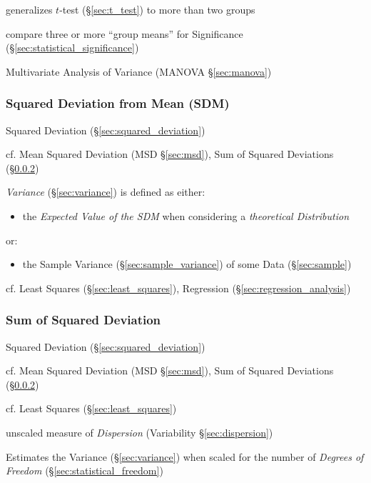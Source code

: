 generalizes $t$-test (\S\ref{sec:t_test}) to more than two groups

compare three or more ``group means'' for Significance
(\S\ref{sec:statistical_significance})

\fist Multivariate Analysis of Variance (MANOVA \S\ref{sec:manova})



\subsubsection{Squared Deviation from Mean (SDM)}\label{sec:sdm}

\fist Squared Deviation (\S\ref{sec:squared_deviation})

cf. Mean Squared Deviation (MSD \S\ref{sec:msd}), Sum of Squared
Deviations (\S\ref{sec:sum_squared_deviation})

\emph{Variance} (\S\ref{sec:variance}) is defined as either:
\begin{itemize}
  \item the \emph{Expected Value of the SDM} when considering a
    \emph{theoretical Distribution}
\end{itemize}
or:
\begin{itemize}
  \item the Sample Variance (\S\ref{sec:sample_variance}) of some Data
    (\S\ref{sec:sample})
\end{itemize}

cf. Least Squares (\S\ref{sec:least_squares}), Regression
(\S\ref{sec:regression_analysis})



\subsubsection{Sum of Squared Deviation}\label{sec:sum_squared_deviation}

\fist Squared Deviation (\S\ref{sec:squared_deviation})

cf. Mean Squared Deviation (MSD \S\ref{sec:msd}), Sum of Squared
Deviations (\S\ref{sec:sum_squared_deviation})

\fist cf. Least Squares (\S\ref{sec:least_squares})

unscaled measure of \emph{Dispersion} (Variability \S\ref{sec:dispersion})

Estimates the Variance (\S\ref{sec:variance}) when scaled for the number of
\emph{Degrees of Freedom} (\S\ref{sec:statistical_freedom})



